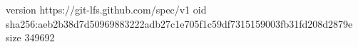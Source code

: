 version https://git-lfs.github.com/spec/v1
oid sha256:aeb2b38d7d50969883222adb27c1e705f1c59df7315159003fb31fd208d2879e
size 349692
